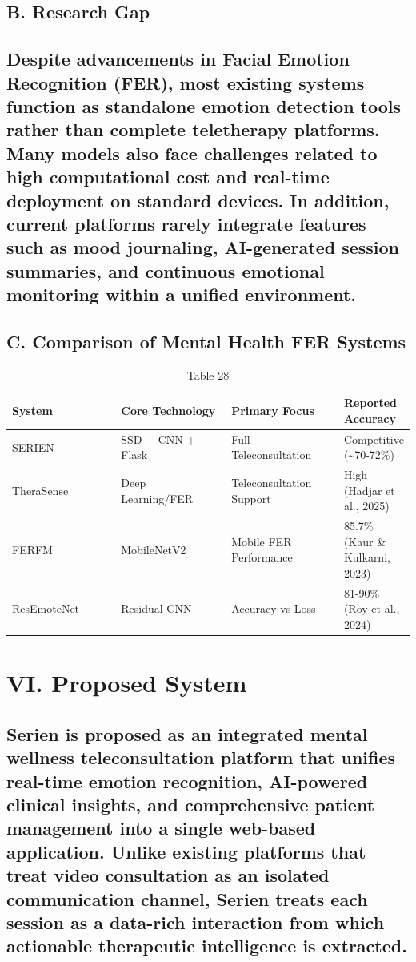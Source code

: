 \documentclass[conference]{IEEEtran}
\begin{document}
\subsection{B. Research Gap}
\subsection{Despite advancements in Facial Emotion Recognition (FER), most existing systems function as standalone emotion detection tools rather than complete teletherapy platforms. Many models also face challenges related to high computational cost and real-time deployment on standard devices. In addition, current platforms rarely integrate features such as mood journaling, AI-generated session summaries, and continuous emotional monitoring within a unified environment.}
\subsection{C. Comparison of Mental Health FER Systems}
\begin{table}[t]
\centering
\caption{Table 28}
\begin{tabular}{|p{0.3\linewidth}|p{0.3\linewidth}|p{0.3\linewidth}|p{0.3\linewidth}|}
\hline
System & Core Technology & Primary Focus & Reported Accuracy \\
\hline
SERIEN & SSD + CNN + Flask & Full Teleconsultation & Competitive (\textasciitilde{}70-72\%) \\
\hline
TheraSense & Deep Learning/FER & Teleconsultation Support & High (Hadjar et al., 2025) \\
\hline
FERFM & MobileNetV2 & Mobile FER Performance & 85.7\% (Kaur \& Kulkarni, 2023) \\
\hline
ResEmoteNet & Residual CNN & Accuracy vs Loss & 81-90\% (Roy et al., 2024) \\
\hline
\end{tabular}
\end{table}
\section{VI. Proposed System}
\subsection{Serien is proposed as an integrated mental wellness teleconsultation platform that unifies real-time emotion recognition, AI-powered clinical insights, and comprehensive patient management into a single web-based application. Unlike existing platforms that treat video consultation as an isolated communication channel, Serien treats each session as a data-rich interaction from which actionable therapeutic intelligence is extracted.}
\end{document}

